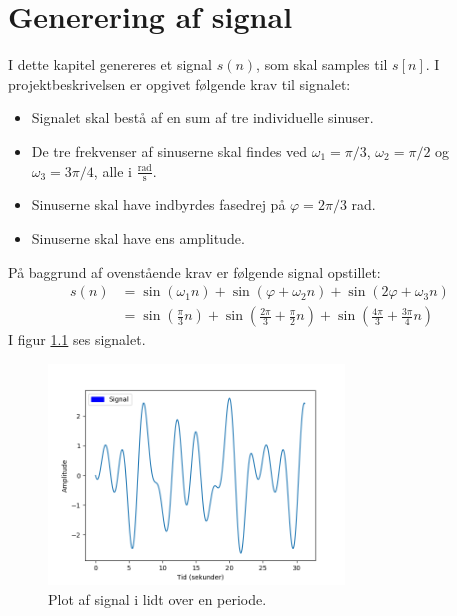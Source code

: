 \chapter{Generering af signal}
I dette kapitel genereres et signal $s(n)$, som skal samples til $s[n]$. I projektbeskrivelsen er opgivet følgende krav til signalet:
\begin{itemize}
\setlength\itemsep{0em}
\item Signalet skal bestå af en sum af tre individuelle sinuser.
\item De tre frekvenser af sinuserne skal findes ved $\omega_1=\pi/3$, $\omega_2=\pi/2$ og $\omega_3=3\pi/4$, alle i $\frac{\text{rad}}{\text{s}}$.
\item Sinuserne skal have indbyrdes fasedrej på $\varphi=2\pi/3$ rad.
\item Sinuserne skal have ens amplitude.
\end{itemize}
På baggrund af ovenstående krav er følgende signal opstillet:
\begin{align}
s(n)&=\sin\left(\omega_1n\right)+\sin\left(\varphi+\omega_2n\right)+\sin\left(2\varphi+\omega_3n\right)\\
&=\sin\left(\frac{\pi}{3}n\right)+\sin\left(\frac{2\pi}{3}+\frac{\pi}{2}n\right)+\sin\left(\frac{4\pi}{3}+\frac{3\pi}{4}n\right)\label{eq:signal}
\end{align}
I figur \ref{fig:signal} ses signalet.
\begin{figure}[H]
\centering
\includegraphics[width=0.7\textwidth]{figures/signal.png}
\caption{Plot af signal i lidt over en periode.}
\label{fig:signal}
\end{figure}
